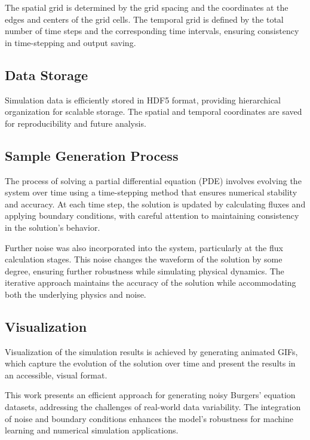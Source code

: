 \documentclass[conference]{IEEEtran}
\begin{document}
The spatial grid is determined by the grid spacing and the coordinates at the edges and centers of the grid cells. The temporal grid is defined by the total number of time steps and the corresponding time intervals, ensuring consistency in time-stepping and output saving.

\subsection{Data Storage}
Simulation data is efficiently stored in HDF5 format, providing hierarchical organization for scalable storage. The spatial and temporal coordinates are saved for reproducibility and future analysis.

\subsection{Sample Generation Process}
The process of solving a partial differential equation (PDE) involves evolving the system over time using a time-stepping method that ensures numerical stability and accuracy. At each time step, the solution is updated by calculating fluxes and applying boundary conditions, with careful attention to maintaining consistency in the solution’s behavior.

Further noise was also incorporated into the system, particularly at the flux calculation stages. This noise changes the waveform of the solution by some degree, ensuring further robustness while simulating physical dynamics. The iterative approach maintains the accuracy of the solution while accommodating both the underlying physics and noise.

\subsection{Visualization}
Visualization of the simulation results is achieved by generating animated GIFs, which capture the evolution of the solution over time and present the results in an accessible, visual format.

This work presents an efficient approach for generating noisy Burgers' equation datasets, addressing the challenges of real-world data variability. The integration of noise and boundary conditions enhances the model’s robustness for machine learning and numerical simulation applications.
\end{document}
